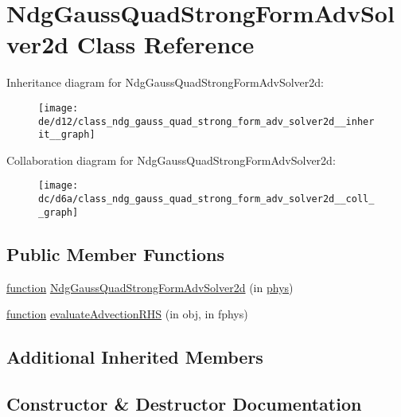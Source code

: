 \hypertarget{class_ndg_gauss_quad_strong_form_adv_solver2d}{}\section{Ndg\+Gauss\+Quad\+Strong\+Form\+Adv\+Solver2d Class Reference}
\label{class_ndg_gauss_quad_strong_form_adv_solver2d}


Inheritance diagram for Ndg\+Gauss\+Quad\+Strong\+Form\+Adv\+Solver2d\+:
\nopagebreak
\begin{figure}[H]
\begin{center}
\leavevmode
\texttt{[image: de/d12/class\_ndg\_gauss\_quad\_strong\_form\_adv\_solver2d\_\_inherit\_\_graph]}
\end{center}
\end{figure}


Collaboration diagram for Ndg\+Gauss\+Quad\+Strong\+Form\+Adv\+Solver2d\+:
\nopagebreak
\begin{figure}[H]
\begin{center}
\leavevmode
\texttt{[image: dc/d6a/class\_ndg\_gauss\_quad\_strong\_form\_adv\_solver2d\_\_coll\_\_graph]}
\end{center}
\end{figure}
\subsection*{Public Member Functions}
\begin{DoxyCompactItemize}
\item 
\hyperlink{class_ndg_gauss_quad_strong_form_solver_af755d69cea40fa91c0aab6b13409e11f}{function} \hyperlink{class_ndg_gauss_quad_strong_form_adv_solver2d_ac6ab1b054e984b37213428f97211c17f}{Ndg\+Gauss\+Quad\+Strong\+Form\+Adv\+Solver2d} (in \hyperlink{class_ndg_abstract_adv_solver_aef07c3e090321fa7a09d8120f74f5964}{phys})
\item 
\hyperlink{class_ndg_gauss_quad_strong_form_solver_af755d69cea40fa91c0aab6b13409e11f}{function} \hyperlink{class_ndg_gauss_quad_strong_form_adv_solver2d_a197e127606d40d29f5e512b1a9912a8e}{evaluate\+Advection\+R\+HS} (in obj, in fphys)
\end{DoxyCompactItemize}
\subsection*{Additional Inherited Members}


\subsection{Constructor \& Destructor Documentation}
\mbox{\label{class_ndg_gauss_quad_strong_form_adv_solver2d_ac6ab1b054e984b37213428f97211c17f}} 
